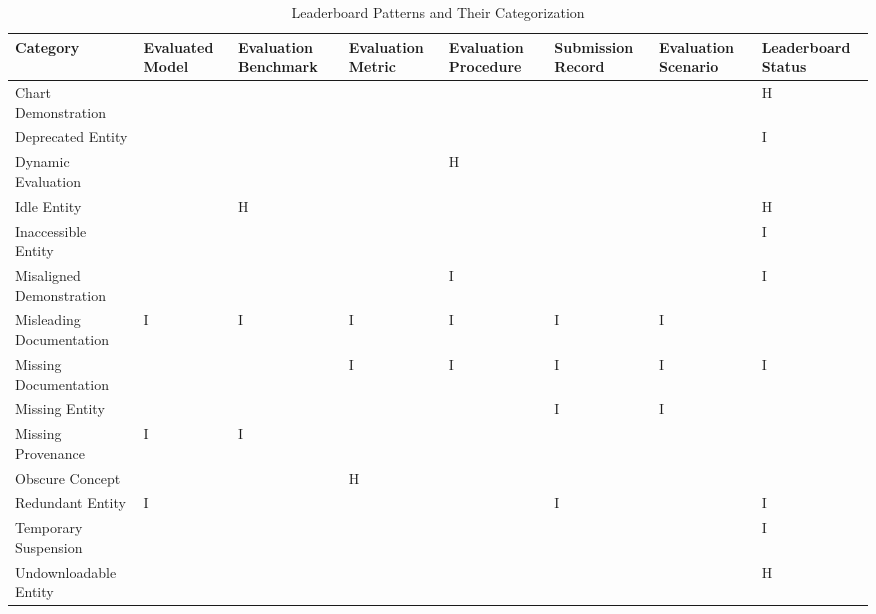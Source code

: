\begin{table}
\caption{Leaderboard Patterns and Their Categorization}
\label{tab:pattern}
\begin{tabular}{llllllll}
\toprule
Category & Evaluated Model & Evaluation Benchmark & Evaluation Metric & Evaluation Procedure & Submission Record & Evaluation Scenario & Leaderboard Status \\
\midrule
Chart Demonstration &  &  &  &  &  &  & H \\
Deprecated Entity &  &  &  &  &  &  & I \\
Dynamic Evaluation &  &  &  & H &  &  &  \\
Idle Entity &  & H &  &  &  &  & H \\
Inaccessible Entity &  &  &  &  &  &  & I \\
Misaligned Demonstration &  &  &  & I &  &  & I \\
Misleading Documentation & I & I & I & I & I & I &  \\
Missing Documentation &  &  & I & I & I & I & I \\
Missing Entity &  &  &  &  & I & I &  \\
Missing Provenance & I & I &  &  &  &  &  \\
Obscure Concept &  &  & H &  &  &  &  \\
Redundant Entity & I &  &  &  & I &  & I \\
Temporary Suspension &  &  &  &  &  &  & I \\
Undownloadable Entity &  &  &  &  &  &  & H \\
\bottomrule
\end{tabular}
\end{table}
